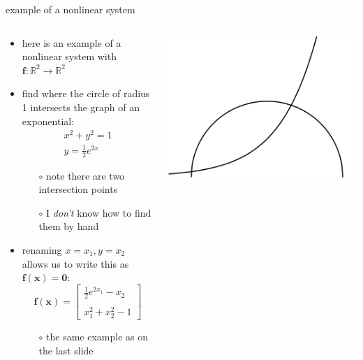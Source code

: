 \documentclass[10pt,hyperref]{beamer}
\newcommand{\bbf}{\mathbf{f}}
\newcommand{\bx}{\mathbf{x}}
\newcommand{\bzero}{\bm{0}}
\newcommand{\RR}{\mathbb{R}}
\begin{document}
\begin{frame}{example of a nonlinear system}

\begin{columns}
\begin{column}{0.55\textwidth}
\begin{itemize}
\item here is an example of a nonlinear system with $\bbf:\RR^2\to\RR^2$
\item find where the circle of radius 1 intersects the graph of an exponential:
\begin{align*}
x^2+y^2 = 1 \\
y = \tfrac{1}{2} e^{2x}
\end{align*}

  \begin{itemize}
  \item[$\circ$] note there are two intersection points
  \item[$\circ$] I \emph{don't} know how to find them by hand
  \end{itemize}
\item renaming $x=x_1,y=x_2$ allows us to write this as $\bbf(\bx)=\bzero$:
  $$\bbf(\bx) = \begin{bmatrix} \frac{1}{2} e^{2x_1} - x_2 \\ \\ x_1^2 + x_2^2 - 1 \end{bmatrix}$$

  \begin{itemize}
  \item[$\circ$] the same example as on the last slide
  \end{itemize}
\end{itemize}
\end{column}
\begin{column}{0.45\textwidth}
\includegraphics[width=\textwidth]{nonlinexample.png}
\end{column}
\end{columns}
\end{frame}
\end{document}
